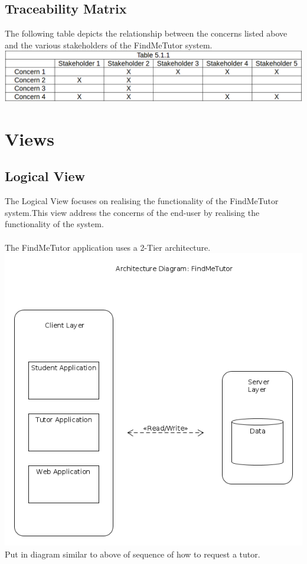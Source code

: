 \documentclass[12pt]{article}
\begin{document}
\subsection{Traceability Matrix}
The following table depicts the relationship between the concerns listed above and the various stakeholders of the FindMeTutor system.\\
\includegraphics[width=140mm]{./trace.png}

\pagebreak

\section{Views}

\subsection{Logical View}
The Logical View focuses on realising the functionality of the FindMeTutor system.This view address the concerns of the end-user by realising the functionality of the system.\\\\
The FindMeTutor application uses a 2-Tier architecture.\\
\includegraphics[width=140mm]{./architecture_diagram.png}
Put in diagram similar to above of sequence of how to request a tutor.\\
\end{document}
